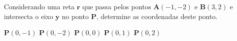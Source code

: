 Considerando uma reta $\mathbf{r}$ que passa pelos pontos $\mathbf{A}(-1, -2)$ e $\mathbf{B}(3,2)$ e intersecta o eixo $\mathbf{y}$ no ponto $\mathbf{P}$, determine as coordenadas deste ponto.

$\mathbf{P}(0,-1)$
$\mathbf{P}(0,-2)$
$\mathbf{P}(0,0)$
$\mathbf{P}(0,1)$
$\mathbf{P}(0,2)$





